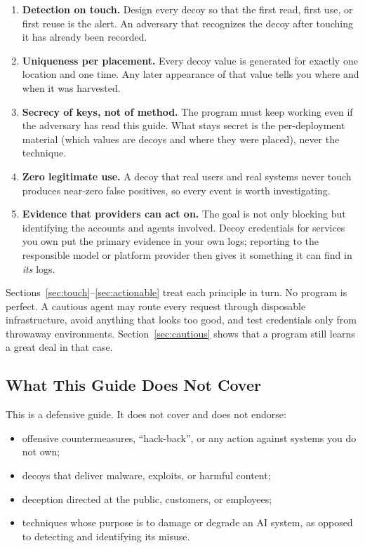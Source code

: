 \documentclass[11pt,letterpaper]{article}
\begin{document}
\begin{keybox}
\begin{enumerate}
  \item \textbf{Detection on touch.} Design every decoy so that the first read, first use, or first reuse is the alert. An adversary that recognizes the decoy after touching it has already been recorded.
  \item \textbf{Uniqueness per placement.} Every decoy value is generated for exactly one location and one time. Any later appearance of that value tells you where and when it was harvested.
  \item \textbf{Secrecy of keys, not of method.} The program must keep working even if the adversary has read this guide. What stays secret is the per-deployment material (which values are decoys and where they were placed), never the technique.
  \item \textbf{Zero legitimate use.} A decoy that real users and real systems never touch produces near-zero false positives, so every event is worth investigating.
  \item \textbf{Evidence that providers can act on.} The goal is not only blocking but identifying the accounts and agents involved. Decoy credentials for services you own put the primary evidence in your own logs; reporting to the responsible model or platform provider then gives it something it can find in \emph{its} logs.
\end{enumerate}
\end{keybox}

Sections~\ref{sec:touch}--\ref{sec:actionable} treat each principle in turn. No program is perfect. A cautious agent may route every request through disposable infrastructure, avoid anything that looks too good, and test credentials only from throwaway environments. Section~\ref{sec:cautious} shows that a program still learns a great deal in that case.

\subsection{What This Guide Does Not Cover}
\label{sec:notcovered}

\begin{scopebox}
This is a defensive guide. It does not cover and does not endorse:
\begin{itemize}
  \item offensive countermeasures, ``hack-back'', or any action against systems you do not own;
  \item decoys that deliver malware, exploits, or harmful content;
  \item deception directed at the public, customers, or employees;
  \item techniques whose purpose is to damage or degrade an AI system, as opposed to detecting and identifying its misuse.
\end{itemize}
\end{scopebox}
\end{document}
